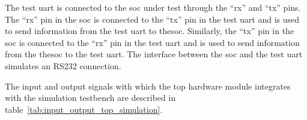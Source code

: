 The test \acrshort{uart} is connected to the \acrshort{soc} under test through the \enquote{rx} and \enquote{tx} pins. The \enquote{rx} pin in the \acrshort{soc} is connected to the \enquote{tx} pin in the test \acrshort{uart} and is used to send information from the test \acrshort{uart} to the\acrshort{soc}. Similarly, the \enquote{tx} pin in the \acrshort{soc} is connected to the \enquote{rx} pin in the test \acrshort{uart} and is used to send information from the the\acrshort{soc} to the test \acrshort{uart}. The interface between the \acrshort{soc} and the test \acrshort{uart} simulates an RS232 connection.

The input and output signals with which the top hardware module integrates with the simulation testbench are described in table~\ref{tab:input_output_top_simulation}.

